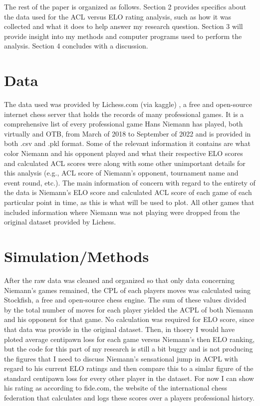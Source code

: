 \documentclass[12pt, letterpaper, titlepage]{article}
\begin{document}
The rest of the paper is organized as follows. Section 2 provides specifics about the data used for the ACL versus ELO rating analysis, such as how it was collected and what it does to help answer my research question. Section 3 will provide insight into my methods and computer programs used to perform the analysis. Section 4 concludes with a discussion.

\section*{Data}
\label{sec:data}

The data used was provided by Lichess.com (via kaggle) \citep{zaidqureshi2022}, a free and open-source internet chess server that holds the records of many professional games. It is a comprehensive list of every professional game Hans Niemann has played, both virtually and OTB, from March of 2018 to September of 2022 and is provided in both .csv and .pkl format. Some of the relevant information it contains are what color Niemann and his opponent played and what their respective ELO scores and calculated ACL scores were along with some other unimportant details for this analysis (e.g., ACL score of Niemann's opponent, tournament name and event round, etc.). The main information of concern with regard to the entirety of the data is Niemann's ELO score and calculated ACL score of each game of each particular point in time, as this is what will be used to plot. All other games that included information where Niemann was not playing were dropped from the original dataset provided by Lichess.

\section*{Simulation/Methods}
\label{sec:sim}


After the raw data was cleaned and organized so that only data concerning Niemann's games remained, the CPL of each players moves was calculated using Stockfish, a free and open-source chess engine. The sum of these values divided by the total number of moves for each player yielded the ACPL of both Niemann and his opponent for that game. No calculation was required for ELO score, since that data was provide in the original dataset. Then, in thoery I would have ploted average centipawn loss for each game versus Niemann's then ELO ranking, but the code for this part of my research is still a bit buggy and is not producing the figures that I need to discuss Niemann's sensational jump in ACPL with regard to his current ELO ratings and then compare this to a simlar figure of the standard centipawn loss for every other player in the dataset. For now I can show his rating as according to fide.com, the website of the international chess federation that calculates and logs these scores over a players professional history.
\end{document}
